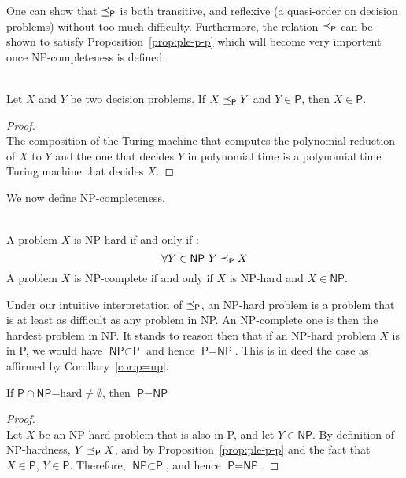 One can show that \(\preceq_\textsf{P}\) is both transitive, and reflexive (a quasi-order on decision problems) without too much difficulty. Furthermore, the relation \(\preceq_\textsf{P}\) can be shown to satisfy Proposition~\ref{prop:ple-p-p} which will become very importent once \textsf{NP}-completeness is defined.
\begin{proposition}\ \\
    \label{prop:ple-p-p}
    Let \(X \) and \(Y \) be two decision problems. If \(X \preceq_\textsf{P} Y\) and \(Y \in \textsf{P}\), then \(X \in \textsf{P}\).
\end{proposition}
\begin{proof}\ \\
    The composition of the Turing machine that computes the polynomial reduction of \(X\) to \(Y\) and the one that decides \(Y\) in polynomial time is a polynomial time Turing machine that decides \(X\).
\end{proof}

We now define \textsf{NP}-completeness.
\begin{definition}\ \\
    A problem \(X\) is \textsf{NP}-hard if and only if :
    \[\forall Y \in \textsf{NP}\ Y \preceq_\textsf{P} X\]
    A problem \(X\) is \textsf{NP}-complete if and only if \(X\) is \textsf{NP}-hard and \(X\in\textsf{NP}\).
\end{definition}

Under our intuitive interpretation of \(\preceq_\textsf{P}\), an \textsf{NP}-hard problem is a problem that is at least as difficult as any problem in \textsf{NP}. An \textsf{NP}-complete one is then the hardest problem in \textsf{NP}. It stands to reason then that if an \textsf{NP}-hard problem \(X\) is in \textsf{P}, we would have \(\textsf{NP} \subset \textsf{P}\) and hence \(\textsf{P}= \textsf{NP}\). This is in deed the case as affirmed by Corollary~\ref{cor:p=np}.

\begin{corollary}
    \label{cor:p=np}
    If \(\textsf{P} \cap \textsf{NP}\mathrm{-hard} \neq \emptyset\), then \(\textsf{P}=\textsf{NP}\)
\end{corollary}

\begin{proof}\ \\
    Let \(X\) be an \textsf{NP}-hard problem that is also in \textsf{P}, and let \(Y\in\textsf{NP}\). By definition of \textsf{NP}-hardness, \(Y\preceq_\textsf{P} X\), and by Proposition~\ref{prop:ple-p-p} and the fact that \(X\in\textsf{P}\), \(Y\in\textsf{P}\).
    Therefore, \(\textsf{NP} \subset \textsf{P}\), and hence \(\textsf{P}=\textsf{NP}\).
\end{proof}

